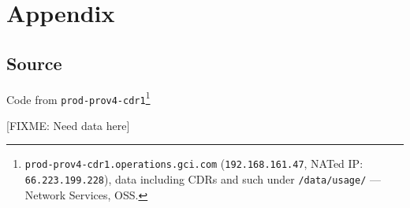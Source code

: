 \documentclass[12pt,letterpaper,dvips]{article}
\newcommand{\FIXME}[1]{\textsf{[FIXME: #1]}}
\begin{document}
\setcounter{secnumdepth}{0}
\section{Appendix}


\subsection{Source}
Code from
\texttt{prod-prov4-cdr1}\footnote{\texttt{prod-prov4-cdr1.operations.gci.com}
  (\texttt{192.168.161.47}, NATed IP: \texttt{66.223.199.228}), data including
  CDRs and such under \texttt{/data/usage/} ---
  Network Services, OSS.}

\vspace{20pt}
\noindent\FIXME{Need data here}
\end{document}
